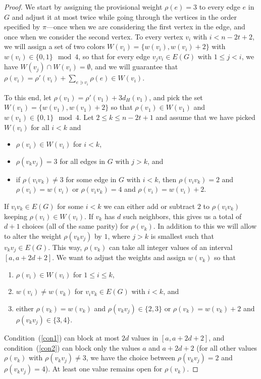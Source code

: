 \documentclass[reqno,12pt,epsf]{amsart}
\def\om{\omm}
\def\omm{\rho}
\begin{document}
\begin{proof}
We start by assigning the provisional weight $\om(e)=3$ to every edge $e$ in $G$ and adjust it at most twice while going through the vertices in the order specified by $\pi$---once when we are considering the first vertex in the edge, and once when we consider the second vertex. To every vertex $v_i$ with $i<n-2t+2$, we will assign a set of two colors $W(v_i)=\{w(v_i), w(v_i)+2\}$ with $w(v_i)\in \{ 0,1\}\mod 4$, so that for every edge $v_jv_i\in E(G)$ with $1\le j<i$, we have $W(v_j)\cap W(v_i)=\emptyset$, and we will guarantee that $\om(v_i)=\om'(v_i)+\sum_{e\ni v_i}\om(e)\in W(v_i)$. 

To this end, let $\om(v_1)=\omm '(v_1)+3d_H(v_1)$, and pick the set $W(v_1)=\{ w(v_1),w(v_1)+2\}$ so that $\om(v_1)\in W(v_1)$ and $w(v_1)\in \{ 0,1\}\mod 4$.
Let $2\le k\le n-2t+1$ and assume that we have picked $W(v_i)$ for all $i<k$ and
\begin{itemize}
\item $\om(v_i)\in W(v_i)$ for $i<k$,
\item $\om(v_kv_j)=3$ for all edges in $G$ with $j>k$, and
\item if $\om(v_iv_k)\ne 3$ for some edge in $G$ with $i<k$, then $\om(v_iv_k)=2$ and $\om(v_i)=w(v_i)$ or $\om(v_iv_k)=4$ and $\om(v_i)=w(v_i)+2$.
\end{itemize}
%

If $v_iv_k\in E(G)$ for some $i<k$ we can either add or subtract $2$ to $\om(v_iv_k)$ keeping $\om(v_i)\in W(v_i)$. If $v_k$ has $d$ such neighbors, this gives us a total of $d+1$ choices (all of the same parity) for $\om(v_k)$. In addition to this we will allow to alter the weight $\om(v_kv_j)$ by $1$, where $j>k$ is smallest such that $v_kv_j\in E(G)$. This way, $\om(v_k)$ can take all integer values of an interval $[a,a+2d+2]$. We want to adjust the weights and assign $w(v_k)$ so that
\begin{enumerate}
\item $\om(v_i)\in W(v_i)$ for $1\le i\le k$,
\item $w(v_i)\ne w(v_k)$ for $v_iv_k\in E(G)$ with $i<k$, and\label{con1}
\item either $\om(v_k)=w(v_k)$ and $\om(v_kv_j)\in \{2,3\}$ or $\om(v_k)=w(v_k)+2$ and $\om(v_kv_j)\in \{3,4\}$.\label{con2}
\end{enumerate}
Condition~(\ref{con1}) can block at most $2d$ values in $[a,a+2d+2]$, and condition~(\ref{con2}) can block only the values $a$ and $a+2d+2$ (for all other values $\om(v_k)$ with $\om(v_kv_j)\ne 3$, we have the choice between $\om(v_kv_j)=2$ and $\om(v_kv_j)=4$). At least one value remains open for $\om(v_k)$.


\end{proof}
\end{document}
